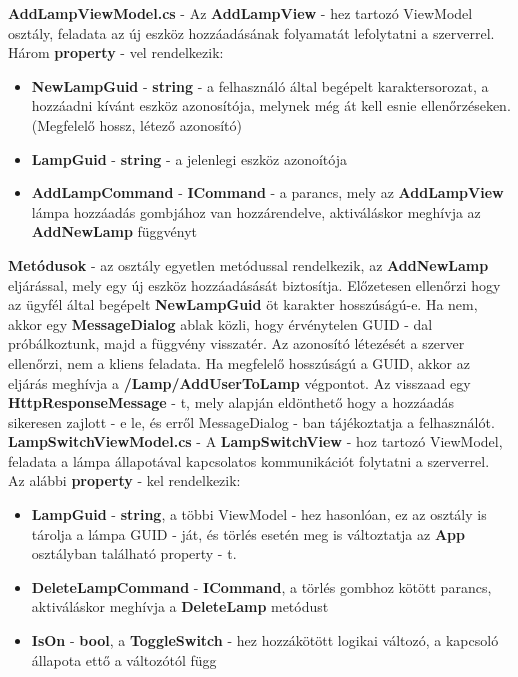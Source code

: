 \documentclass[a4paper,12pt]{report}
\begin{document}
    \textbf{AddLampViewModel.cs} - Az \textbf{AddLampView} - hez tartozó ViewModel osztály, feladata az új eszköz hozzáadásának
    folyamatát lefolytatni a szerverrel.\\
    Három \textbf{property} - vel rendelkezik:

    \begin{itemize}
        \item \textbf{NewLampGuid} - \textbf{string} - a felhasználó által begépelt karaktersorozat, a hozzáadni kívánt eszköz azonosítója,
        melynek még át kell esnie ellenőrzéseken. (Megfelelő hossz, létező azonosító)
        \item \textbf{LampGuid} - \textbf{string} - a jelenlegi eszköz azonoítója
        \item \textbf{AddLampCommand} - \textbf{ICommand} - a parancs, mely az \textbf{AddLampView} lámpa hozzáadás gombjához van hozzárendelve,
        aktiváláskor meghívja az \textbf{AddNewLamp} függvényt
    \end{itemize}

    \textbf{Metódusok} - az osztály egyetlen metódussal rendelkezik, az \textbf{AddNewLamp} eljárással, mely egy új eszköz hozzáadásását
    biztosítja. Előzetesen ellenőrzi hogy az ügyfél által begépelt \textbf{NewLampGuid} öt karakter hosszúságú-e. Ha nem, akkor egy
    \textbf{MessageDialog} ablak közli, hogy érvénytelen GUID - dal próbálkoztunk, majd a függvény visszatér. Az azonosító létezését
    a szerver ellenőrzi, nem a kliens feladata. Ha megfelelő hosszúságú a GUID, akkor az eljárás meghívja a \textbf{/Lamp/AddUserToLamp}
    végpontot. Az visszaad egy \textbf{HttpResponseMessage} - t, mely alapján eldönthető hogy a hozzáadás sikeresen zajlott - e le, és erről
    MessageDialog - ban tájékoztatja a felhasználót.\\

    \textbf{LampSwitchViewModel.cs} - A \textbf{LampSwitchView} - hoz tartozó ViewModel, feladata a lámpa állapotával kapcsolatos
    kommunikációt folytatni a szerverrel.\\

    Az alábbi \textbf{property} - kel rendelkezik:

    \begin{itemize}
        \item \textbf{LampGuid} - \textbf{string}, a többi ViewModel - hez hasonlóan, ez az osztály is tárolja a lámpa GUID - ját, és törlés
        esetén meg is változtatja az \textbf{App} osztályban található property - t.
        \item \textbf{DeleteLampCommand} - \textbf{ICommand}, a törlés gombhoz kötött parancs, aktiváláskor meghívja a \textbf{DeleteLamp} metódust
        \item \textbf{IsOn} - \textbf{bool}, a \textbf{ToggleSwitch} - hez hozzákötött logikai változó, a kapcsoló állapota ettő a változótól függ
    \end{itemize}
\end{document}
